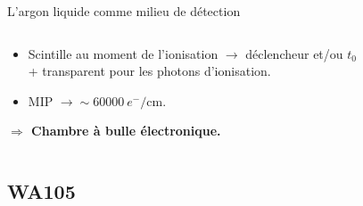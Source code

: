 \begin{frame}{L'argon liquide comme milieu de détection}
\begin{scriptsize}
\begin{columns}
\begin{column}{0.4\textwidth}
\begin{itemize}
               				\item Scintille au moment de l'ionisation $\rightarrow$ déclencheur et/ou $t_0$ \\ + transparent pour les photons  d'ionisation.
             				\item MIP $\rightarrow\sim\SI{60000}{e^-\per\centi\meter}$. \\
               			\end{itemize}
               			\begin{footnotesize}
           	    			\textbf{$\Rightarrow$ Chambre à bulle électronique.}
           	    		\end{footnotesize}
               		\end{column}
               	\end{columns}
         	  \end{scriptsize}
            \end{frame}
    
    \subsection{WA105}

